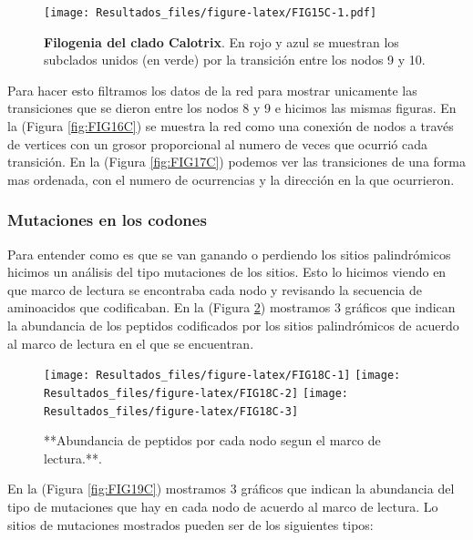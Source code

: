 \documentclass[
]{book}
\begin{document}
\begin{figure}
\centering
\texttt{[image: Resultados\_files/figure-latex/FIG15C-1.pdf]}
\caption{\label{fig:FIG15C}\textbf{Filogenia del clado Calotrix}. En rojo y azul se muestran los subclados unidos (en verde) por la transición entre los nodos 9 y 10.}
\end{figure}

Para hacer esto filtramos los datos de la red para mostrar unicamente las transiciones que se dieron entre los nodos 8 y 9 e hicimos las mismas figuras.
En la (Figura \ref{fig:FIG16C}) se muestra la red como una conexión de nodos a través de vertices con un grosor proporcional al numero de veces que ocurrió cada transición. En la (Figura \ref{fig:FIG17C}) podemos ver las transiciones de una forma mas ordenada, con el numero de ocurrencias y la dirección en la que ocurrieron.

\hypertarget{mutaciones-en-los-codones-2}{%
\subsubsection{Mutaciones en los codones}\label{mutaciones-en-los-codones-2}}

Para entender como es que se van ganando o perdiendo los sitios palindrómicos hicimos un análisis del tipo mutaciones de los sitios. Esto lo hicimos viendo en que marco de lectura se encontraba cada nodo y revisando la secuencia de aminoacidos que codificaban. En la (Figura \ref{fig:FIG18C}) mostramos 3 gráficos que indican la abundancia de los peptidos codificados por los sitios palindrómicos de acuerdo al marco de lectura en el que se encuentran.

\begin{figure}

{\centering \texttt{[image: Resultados\_files/figure-latex/FIG18C-1]} \texttt{[image: Resultados\_files/figure-latex/FIG18C-2]} \texttt{[image: Resultados\_files/figure-latex/FIG18C-3]} 

}

\caption{**Abundancia de peptidos por cada nodo segun el marco de lectura.**.}\label{fig:FIG18C}
\end{figure}

En la (Figura \ref{fig:FIG19C}) mostramos 3 gráficos que indican la abundancia del tipo de mutaciones que hay en cada nodo de acuerdo al marco de lectura. Lo sitios de mutaciones mostrados pueden ser de los siguientes tipos:
\end{document}
